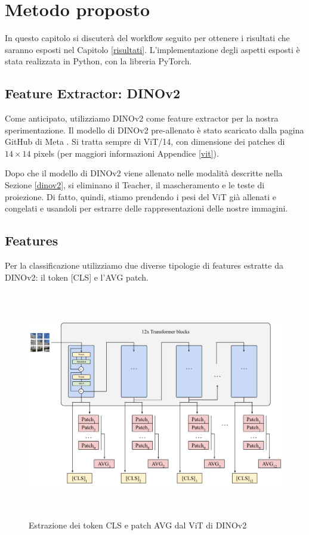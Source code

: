 \chapter{Metodo proposto}
\label{metodo}


In questo capitolo si discuterà del workflow seguito per ottenere i risultati che saranno esposti nel Capitolo \ref{risultati}. L'implementazione degli aspetti esposti è stata realizzata in Python, con la libreria PyTorch. 

\section{Feature Extractor: DINOv2}
Come anticipato, utilizziamo DINOv2 come feature extractor per la nostra sperimentazione. Il modello di DINOv2 pre-allenato è stato scaricato dalla pagina GitHub di Meta \cite{dinov2_github}. Si tratta sempre di ViT/14, con dimensione dei patches di \(14 \times 14\) pixels (per maggiori informazioni Appendice \ref{vit}). 

Dopo che il modello di DINOv2 viene allenato nelle modalità descritte nella Sezione \ref{dinov2}, si eliminano il Teacher, il mascheramento e le teste di proiezione. Di fatto, quindi, stiamo prendendo i pesi del ViT già allenati e congelati e usandoli per estrarre delle rappresentazioni delle nostre immagini.


\section{Features}
Per la classificazione utilizziamo due diverse tipologie di features estratte da DINOv2: il token [CLS] e l'AVG patch.

\begin{figure}[t]
    \centering
    \includegraphics[height=10cm]{Immagini/metodo/tokens_arch.pdf}
    \caption{Estrazione dei token CLS e patch AVG dal ViT di DINOv2}
    \label{fig:token}
\end{figure}

